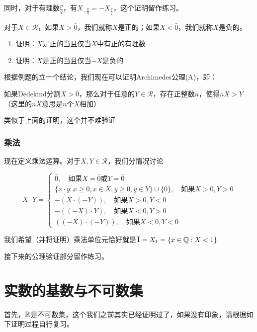 同时，对于有理数$\displaystyle \frac{p}{q}$，有$X_{-\frac{p}{q}}=-X_{\frac{p}{q}}$，这个证明留作练习。

对于$X\in\mathcal{R}$，如果$X>\bar{0}$，我们就称$X$是正的；如果$X<\bar{0}$，我们就称$X$是负的。

\begin{example}%
    \begin{enumerate}
        \item 证明：$X$是正的当且仅当$X$中有正的有理数
        \item 证明：$X$是正的当且仅当$-X$是负的
    \end{enumerate}
\end{example}

根据例题的立一个结论，我们现在可以证明Archimedes公理(A)，即：

如果Dedekind分割$X>\bar{0}$，那么对于任意的$Y\in\mathcal{R}$，存在正整数$n$，使得$nX>Y$（这里的$nX$意思是$n$个$X$相加）

类似于上面的证明，这个并不难验证

\subsubsection*{乘法}

现在定义乘法运算。对于$X,Y\in\mathcal{R}$，我们分情况讨论

\begin{equation*}
    X\cdot Y=\begin{cases}
        \bar{0},\quad \text{如果}X=\bar{0}\text{或}Y=\bar{0}\\
        \{x\cdot y:x\geq 0,x\in X,y\geq 0,y\in Y\}\cup\{0\},\quad\text{如果}X>0,Y>0\\
        -(X\cdot (-Y)),\quad\text{如果}X>0,Y<0\\
        -((-X)\cdot Y),\quad \text{如果}X<0,Y>0\\
        ((-X)\cdot(-Y)),\quad \text{如果}X<0,Y<0
    \end{cases}
\end{equation*}

我们希望（并将证明）乘法单位元恰好就是$\bar{1} = X_1 =\{x\in \mathbb{Q}:X<1\}$

接下来的公理验证部分留作练习。

\section{实数的基数与不可数集}

首先，$\mathbb{R}$是不可数集，这个我们之前其实已经证明过了，如果没有印象，请根据如下证明过程自行复习。

